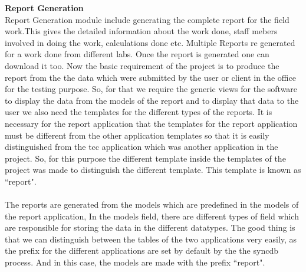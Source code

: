 \newpage
{\bf Report Generation}\\

Report Generation module include generating the complete report for the 
field work.This gives the detailed information about the work done, 
staff mebers involved in doing the work, calculations done etc. 
Multiple Reports re generated for a work done from different labs. 
Once the report is generated one can download it too. Now the basic 
requirement of the project  is to produce the report from the the data 
which were submitted by the user or client in the office for the 
testing purpose. So, for that we require the generic views for the 
software to display the data from the models of the report and to 
display that data to the user we also need the templates for the 
different types of the reports. It is necessary for the report 
application that the templates for the report application must be 
different from the other application templates so that it is easily 
distinguished from the tcc application which was another application 
in the project. So, for this purpose the different template inside the 
templates of the project was made to distinguish the different template. 
This template is known as ``report".\\\\
The reports are generated from the models which are predefined in the 
models of the report application, In the  models field, there are 
different types of field which are responsible for storing the data in 
the different datatypes. The good thing is that we can distinguish 
between the tables of the two applications very easily, as the prefix 
for the different applications are set by default by the the syncdb 
process. And in this case, the models are made with the prefix 
``report".\\\\
